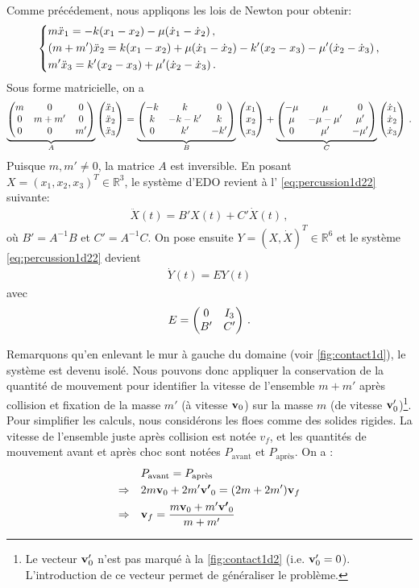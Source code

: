 \noindent Comme précédement, nous appliqons les lois de Newton pour obtenir:
\begin{align}
    \begin{dcases}
    m\ddot x_1 = -k(x_1 - x_2) - \mu (\dot x_1 - \dot x_2) \,, \\
    (m+m')\ddot x_2 = k(x_1 - x_2) + \mu (\dot x_1 - \dot x_2) - k'(x_2 - x_3) - \mu'(\dot x_2 - \dot x_3) \,, \\
        m' \ddot x_3 =  k'(x_2 - x_3) + \mu'(\dot x_2 - \dot x_3) \,. 
    \end{dcases}
\end{align}
Sous forme matricielle, on a
\begin{align}
    \underbrace{\begin{pmatrix} m & 0 & 0 \\ 0 & m+m' & 0 \\ 0 & 0 & m' \end{pmatrix}}_{A} \begin{pmatrix} \ddot{x}_1 \\ \ddot{x}_2 \\ \ddot{x}_3 \end{pmatrix} =  
    \underbrace{\begin{pmatrix} -k & k & 0 \\ k & -k-k' & k \\ 0 & k' & -k' \end{pmatrix}}_{B} \begin{pmatrix} x_1 \\ x_2 \\ x_3 \end{pmatrix} + 
    \underbrace{\begin{pmatrix} -\mu & \mu & 0 \\ \mu & -\mu-\mu' & \mu' \\ 0 & \mu' & -\mu' \end{pmatrix}}_{C} \begin{pmatrix} \dot{x}_1 \\ \dot{x}_2 \\ \dot{x}_3 \end{pmatrix} \,.
\end{align}
Puisque $m, m'\neq 0$, la matrice $A$ est inversible. En posant $X = (x_1, x_2, x_3)^T \in \mathbb{R}^3$, le système d'EDO revient à l' \cref{eq:percussion1d22} suivante:
\begin{align} \label{eq:percussion1d22}
        \ddot{X}(t) = B' X(t) + C'\dot{X}(t) \,, 
\end{align}
où $B' = A^{-1}B$ et $C' = A^{-1}C$. On pose ensuite $Y= (X, \dot X)^T \in \mathbb{R}^6$ et le système \cref{eq:percussion1d22} devient 
\begin{align} \label{eq:systeme1d2}
        \dot{Y}(t)= E Y(t)
\end{align}
avec $$ E = \begin{pmatrix} 0 & I_3 \\ B' & C' \end{pmatrix} \,.$$


Remarquons qu'en enlevant le mur à gauche du domaine (voir \cref{fig:contact1d}), le système est devenu isolé. Nous pouvons donc appliquer la conservation de la quantité de mouvement pour identifier la vitesse de l'ensemble $m+m'$ après collision et fixation de la masse $m'$ (à vitesse $\bm{\mathrm{v}}_0$) sur la masse $m$ (de vitesse $\bm{\mathrm{v}}'_0$)\footnote{Le vecteur $\bm{\mathrm{v}}'_0$ n'est pas marqué à la \cref{fig:contact1d2} (i.e. $\bm{\mathrm{v}}'_0 = 0$). L'introduction de ce vecteur permet de généraliser le problème.}. Pour simplifier les calculs, nous considérons les floes comme des solides rigides. La vitesse de l'ensemble juste après collision est notée $v_f$, et les quantités de mouvement avant et après choc sont notées $P_{\text{avant}}$ et $P_{\text{après}}$. On a :
\begin{align*}
    & \quad P_{\text{avant}} = P_{\text{après}} \\
    \Rightarrow & \quad 2m \bm{\mathrm{v}}_0 + 2m'\bm{\mathrm{v'}}_0 = (2m + 2m') \bm{\mathrm{v}}_f \\
    \Rightarrow & \quad \bm{\mathrm{v}}_f = \frac{m \bm{\mathrm{v}}_0 + m'\bm{\mathrm{v'}}_0}{m+m'}
\end{align*} 

